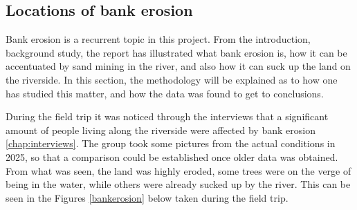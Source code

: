 \subsection{Locations of bank erosion}
Bank erosion is a recurrent topic in this project. From the introduction, background study, the report has illustrated what bank erosion is, how it can be accentuated by sand mining in the river, and also how it can suck up the land on the riverside. 
In this section, the methodology will be explained as to how one has studied this matter, and how the data was found to get to conclusions.

During the field trip it was noticed through the interviews that a significant amount of people living along the riverside were affected by bank erosion \ref{chap:interviews}. The group took some pictures from the actual conditions in 2025, so that a comparison could be established once older data was obtained. From what was seen, the land was highly eroded, some trees were on the verge of being in the water, while others were already sucked up by the river. This can be seen in the Figures \ref{bankerosion} below taken during the field trip.

